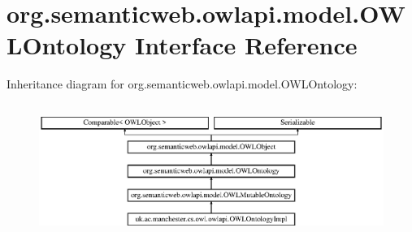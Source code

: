 \hypertarget{interfaceorg_1_1semanticweb_1_1owlapi_1_1model_1_1_o_w_l_ontology}{\section{org.\-semanticweb.\-owlapi.\-model.\-O\-W\-L\-Ontology Interface Reference}
\label{interfaceorg_1_1semanticweb_1_1owlapi_1_1model_1_1_o_w_l_ontology}
}
Inheritance diagram for org.\-semanticweb.\-owlapi.\-model.\-O\-W\-L\-Ontology\-:\begin{figure}[H]
\begin{center}
\leavevmode
\includegraphics[height=4.375000cm]{interfaceorg_1_1semanticweb_1_1owlapi_1_1model_1_1_o_w_l_ontology}
\end{center}
\end{figure}
